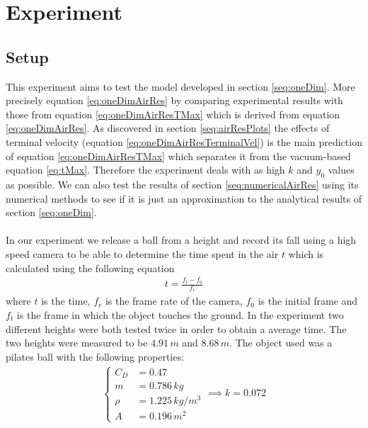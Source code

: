 \documentclass[%
aip,
jmp,
amsmath,amssymb,
reprint,%
]{revtex4-1}
\begin{document}
	\section{Experiment}
	\subsection{Setup}
	This experiment aims to test the model developed in section \ref{seq:oneDim}. More precisely equation \eqref{eq:oneDimAirRes} by comparing experimental results with those from equation \eqref{eq:oneDimAirResTMax} which is derived from equation \eqref{eq:oneDimAirRes}. As discovered in section \ref{seq:airResPlots} the effects of terminal velocity (equation \eqref{eq:oneDimAirResTerminalVel}) is the main prediction of equation \eqref{eq:oneDimAirResTMax} which separates it from the vacuum-based equation \eqref{eq:tMax}. Therefore the experiment deals with as high $k$ and $y_0$ values as possible. We can also test the results of section \ref{seq:numericalAirRes} using its numerical methods to see if it is just an approximation to the analytical results of section \ref{seq:oneDim}.
	\\~\\
	In our experiment we release a ball from a height and record its fall using a high speed camera to be able to determine the time spent in the air $t$ which is calculated using the following equation
	\begin{align}\nonumber
		t=\frac{f_t-f_0}{f_r}
	\end{align}
	where $t$ is the time, $f_r$ is the frame rate of the camera, $f_0$ is the initial frame and $f_t$ is the frame in which the object touches the ground. In the experiment two different heights were both tested twice in order to obtain a average time. The two heights were measured to be $4.91\,m$ and $8.68\,m$. The object used was a pilates ball with the following properties:
	\begin{align}
		\begin{cases}\nonumber
			C_D &= 0.47 \\
			m &= 0.786\,kg\\
			\rho &= 1.225\,kg/m^3\\
			A &= 0.196\,m^2
		\end{cases}\nonumber
		\implies k = 0.072
	\end{align}
\end{document}
